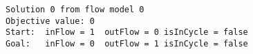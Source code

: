 \begin{verbatim}
Solution 0 from flow model 0
Objective value: 0
Start:	inFlow = 1	outFlow = 0	isInCycle = false
Goal:	inFlow = 0	outFlow = 1	isInCycle = false
\end{verbatim}
